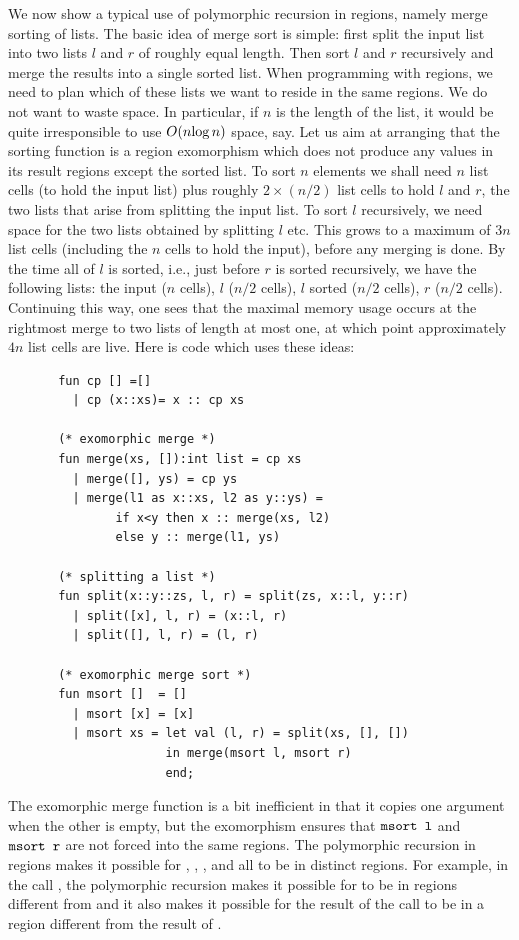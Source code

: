 \documentclass[12pt]{book}
\begin{document}
We now show a typical use of polymorphic recursion in regions, namely
merge sorting of lists. The basic idea of merge sort is simple: first
split the input list into two lists $l$ and $r$ of roughly equal length.
Then sort $l$ and $r$ recursively and merge the results into a single sorted
list.  When programming with regions, we need to plan which of these lists
we want to reside in the same regions. We do not want to waste space. In particular,
if $n$ is the length of the list, it would be quite irresponsible
to use $O(n\hbox{log}\,n)$ space, say.  
Let us aim at arranging that the sorting function is a 
region exomorphism which does not produce any values in its result regions
except the sorted list. To sort $n$ elements we shall need $n$ list cells 
(to hold the input list) plus roughly $2\times(n/2)$ list cells
to hold $l$ and $r$, the two lists that arise from splitting the input list. To sort $l$ recursively, we need space for the two
lists obtained by splitting $l$ etc. This grows to a maximum of $3n$ list cells
(including the $n$ cells to hold the input), before any merging is done.
By the time all of $l$ is sorted, i.e., just before $r$ is sorted recursively,
we have the following lists: the input 
($n$ cells), $l$ ($n/2$ cells), $l$ sorted ($n/2$ cells),
$r$ ($n/2$ cells). Continuing this way, one sees that the maximal memory
usage occurs at the rightmost merge to two lists of length at most one, at
which point approximately $4n$ list cells are live. Here is code which
uses these ideas:
\pagebreak

\begin{verbatim}
       fun cp [] =[]
         | cp (x::xs)= x :: cp xs

       (* exomorphic merge *)
       fun merge(xs, []):int list = cp xs
         | merge([], ys) = cp ys
         | merge(l1 as x::xs, l2 as y::ys) = 
               if x<y then x :: merge(xs, l2) 
               else y :: merge(l1, ys)

       (* splitting a list *)
       fun split(x::y::zs, l, r) = split(zs, x::l, y::r)
         | split([x], l, r) = (x::l, r)
         | split([], l, r) = (l, r)

       (* exomorphic merge sort *)
       fun msort []  = []
         | msort [x] = [x]
         | msort xs = let val (l, r) = split(xs, [], [])
                      in merge(msort l, msort r)
                      end;
\end{verbatim}
The exomorphic merge function is a bit inefficient in that it copies
one argument when the other is empty, but the exomorphism ensures that
$\hbox{\tt msort l}$ and $\hbox{\tt msort r}$ are not forced into the same
regions. The polymorphic recursion in regions makes it possible for
, , ,  and 
all to be in distinct regions. For example, in the call , the polymorphic recursion makes it possible for  to be
in regions different from  and it also makes it possible for
the result of the call to be in a region different from the result of
.
\end{document}
